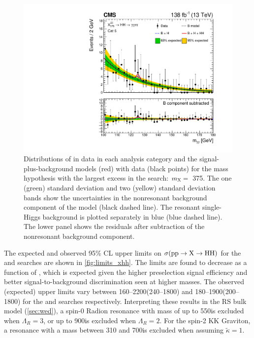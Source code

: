 \begin{figure}
    \includegraphics[width=.45\linewidth]{Figures/Dihiggs/results/sb_models/graviton/ARCGL_Graviton_mx375my125_ggttresmx375my125cat5_CMS_hgg_mass_nbins40_paper.pdf}
    \caption[Signal-Plus-Background Fits to Data for \XTwoHH Search at $\mX=375$\GeV]{Distributions of \mgg in data in each analysis category and the signal-plus-background models (red) with data (black points) for the mass hypothesis with the largest excess in the \XTwoHH search: $m_{\mathrm{X}}=$~375\GeV. The one (green) standard deviation and two (yellow) standard deviation bands show the uncertainties in the nonresonant background component of the model (black dashed line). The resonant single-Higgs background is plotted separately in blue (blue dashed line). The lower panel shows the residuals after subtraction of the nonresonant background component.}\label{fig:sbmodel_1}
\end{figure}

The expected and observed 95\% CL upper limits on $\sigma(\mathrm{p}\mathrm{p} \to \mathrm{X} \to \mathrm{H}\mathrm{H})$ for the \XZeroHH and \XTwoHH searches are shown in \cref{fig:limits_xhh}. The limits are found to decrease as a function of \mX, which is expected given the higher preselection signal efficiency and better signal-to-background discrimination seen at higher masses. The observed (expected) upper limits vary between 160--2200\fb (240--1800\fb) and 180--1900\fb (200--1800\fb) for the \XZeroHH and \XTwoHH searches respectively. Interpreting these results in the RS bulk model (\cref{sec:wed}), a spin-0 Radion resonance with mass of up to 550\GeV is excluded when $\Lambda_R=3$\TeV, or up to 900\GeV is excluded when $\Lambda_R=2$\TeV. For the spin-2 KK Graviton, a resonance with a mass between 310 and 700\GeV is excluded when assuming $\tilde{\kappa} = 1$.

